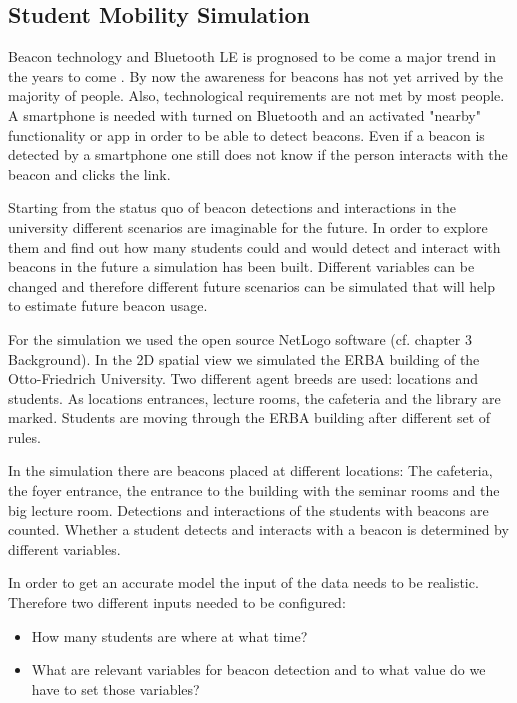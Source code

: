 \subsection{Student Mobility Simulation }

Beacon technology and Bluetooth LE is prognosed to be come a major trend in the years to come \cite{venzke2014standortlokalisierung} \cite{beaconPrognose}. By now the awareness for beacons has not yet arrived by the majority of people.  Also, technological requirements are not met by most people. A smartphone is needed with turned on Bluetooth and an activated "nearby" functionality or app in order to be able to detect beacons. Even if a beacon is detected by a smartphone one still does not know if the person interacts with the beacon and clicks the link. 
\par Starting from the status quo of beacon detections and interactions in the university different scenarios are imaginable for the future. In order to explore them and find out how many students could and would detect and interact with beacons in the future a simulation has been built. Different variables can be changed and therefore different future scenarios can be simulated that will help to estimate future beacon usage.
\par For the simulation we used the open source NetLogo software (cf. chapter 3 Background). In the 2D spatial view we simulated the ERBA building of the Otto-Friedrich University. Two different agent breeds are used: locations and students. As locations entrances, lecture rooms, the cafeteria and the library are marked. Students are moving through the ERBA building after different set of rules. 
\par In the simulation there are beacons placed at different locations: The cafeteria, the foyer entrance, the entrance to the building with the seminar rooms and the big lecture room. Detections and interactions of the students with beacons are counted. Whether a student detects and interacts with a beacon is determined by different variables.
\par In order to get an accurate model the input of the data needs to be realistic. Therefore two different inputs needed to be configured: 
\begin{itemize}
\item How many students are where at what time?
\item What are relevant variables for beacon detection and to what value do we have to set those variables?
\end{itemize}

